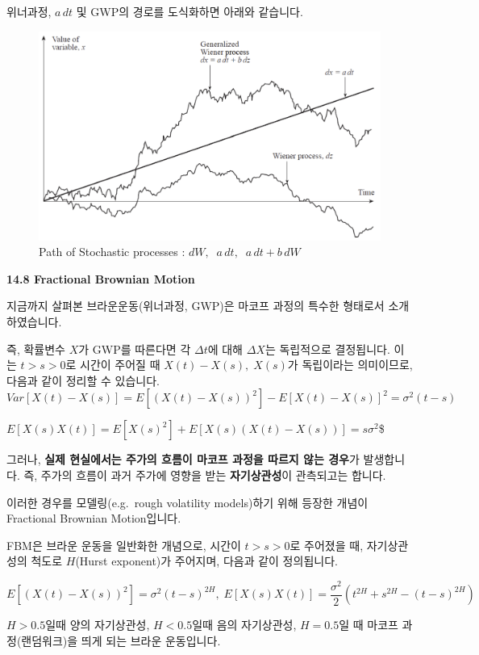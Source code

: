 \documentclass[
  letterpaper,
  DIV=11,
  numbers=noendperiod]{scrreprt}
\begin{document}
위너과정, \(a\,dt\) 및 GWP의 경로를 도식화하면 아래와 같습니다.

\begin{figure}[H]

{\centering \includegraphics{images/chapter14-1.png}

}

\caption{Path of Stochastic processes :
\(dW,\;\;a\,dt,\;\;a\,dt+b\,dW\)}

\end{figure}%

\begin{tcolorbox}[enhanced jigsaw, colback=white, toprule=.15mm, breakable, left=2mm, leftrule=.75mm, colframe=quarto-callout-color-frame, opacityback=0, arc=.35mm, rightrule=.15mm, bottomrule=.15mm]

\vspace{-3mm}\textbf{14.8 Fractional Brownian Motion}\vspace{3mm}

지금까지 살펴본 브라운운동(위너과정, GWP)은 마코프 과정의 특수한
형태로서 소개하였습니다.

즉, 확률변수 \(X\)가 GWP를 따른다면 각 \(\Delta t\)에 대해
\(\Delta X\)는 독립적으로 결정됩니다. 이는 \(t>s>0\)로 시간이 주어질 때
\(X(t)-X(s),\;X(s)\)가 독립이라는 의미이므로, 다음과 같이 정리할 수
있습니다.
\[Var[X(t)-X(s)]=E[(X(t)-X(s))^2]-E[X(t)-X(s)]^2=\sigma^2(t-s)\]

\(E[X(s)X(t)]=E[X(s)^2]+E[X(s)(X(t)-X(s))]=s\sigma^2\)\$

그러나, \textbf{실제 현실에서는 주가의 흐름이 마코프 과정을 따르지 않는
경우}가 발생합니다. 즉, 주가의 흐름이 과거 주가에 영향을 받는
\textbf{자기상관성}이 관측되고는 합니다.

이러한 경우를 모델링(e.g.~rough volatility models)하기 위해 등장한
개념이 Fractional Brownian Motion입니다.

FBM은 브라운 운동을 일반화한 개념으로, 시간이 \(t>s>0\)로 주어졌을 때,
자기상관성의 척도로 \(H\)(Hurst exponent)가 주어지며, 다음과 같이
정의됩니다.

\[E[(X(t)-X(s))^2]=\sigma^2(t-s)^{2H},\;E[X(s)X(t)]=\frac{\sigma^2}{2}(t^{2H}+s^{2H}-(t-s)^{2H})\]

\(H>0.5\)일때 양의 자기상관성, \(H<0.5\)일때 음의 자기상관성,
\(H=0.5\)일 때 마코프 과정(랜덤워크)을 띄게 되는 브라운 운동입니다.

\end{tcolorbox}
\end{document}
